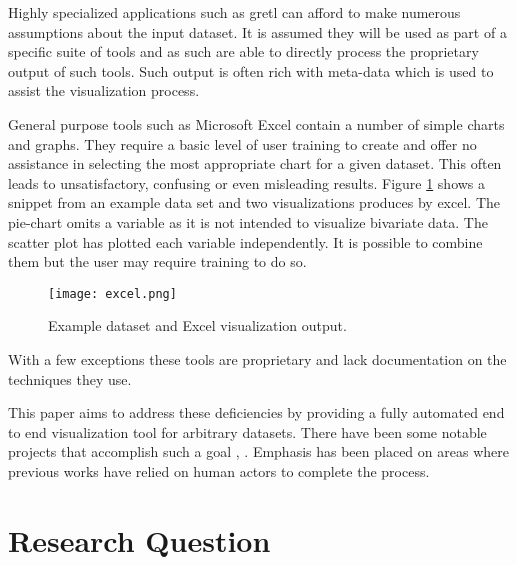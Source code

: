 \documentclass[a4paper, 11pt, titlepage, onehalfspacing]{report}
\begin{document}
Highly specialized applications such as gretl can afford to make numerous assumptions about the input dataset. It is assumed they will be used as part of a specific suite of tools and as such are able to directly process the proprietary output of such tools. Such output is often rich with meta-data which is used to assist the visualization process.

General purpose tools such as Microsoft Excel contain a number of simple charts and graphs. They require a basic level of user training to create and offer no assistance in selecting the most appropriate chart for a given dataset. This often leads to unsatisfactory, confusing or even misleading results. Figure \ref{excel_example} shows a snippet from an example data set and two visualizations produces by excel. The pie-chart omits a variable as it is not intended to visualize bivariate data. The scatter plot has plotted each variable independently. It is possible to combine them but the user may require training to do so. 

\begin{figure}[htp] \centering
\texttt{[image: excel.png]}
\caption{Example dataset and Excel visualization output.}
\label{excel_example}
\end{figure}


With a few exceptions these tools are proprietary and lack documentation on the techniques they use.

This paper aims to address these deficiencies by providing a fully automated end to end visualization tool for arbitrary datasets. There have been some notable projects that accomplish such a goal \cite{stolte2002polaris}, \cite{mackinlay1986automating}. Emphasis has been placed on areas where previous works have relied on human actors to complete the process.



	\section{Research Question}
\end{document}

